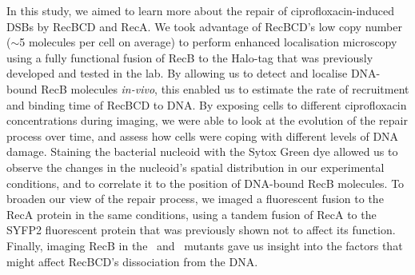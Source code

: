 In this study, we aimed to learn more about the repair of ciprofloxacin-induced DSBs by RecBCD and RecA. We took advantage of RecBCD's low copy number ($\sim$5 molecules per cell on average\cite{Lepore2019a}) to perform enhanced localisation microscopy\cite{Yu2006, Elf2007} using a fully functional fusion of RecB to the Halo-tag that was previously developed and tested in the lab\cite{Lepore2019a}. By allowing us to detect and localise DNA-bound RecB molecules \emph{in-vivo}, this enabled us to estimate the rate of recruitment and binding time of RecBCD to DNA. By exposing cells to different ciprofloxacin concentrations during imaging, we were able to look at the evolution of the repair process over time, and assess how cells were coping with different levels of DNA damage. Staining the bacterial nucleoid with the Sytox Green dye allowed us to observe the changes in the nucleoid's spatial distribution in our experimental conditions, and to correlate it to the position of DNA-bound RecB molecules. To broaden our view of the repair process, we imaged a fluorescent fusion to the RecA protein in the same conditions, using a tandem fusion of RecA to the SYFP2 fluorescent protein that was previously shown not to affect its function\cite{Wiktor2021}. Finally, imaging RecB in the \dreca\ and \teneighty\ mutants gave us insight into the factors that might affect RecBCD's dissociation from the DNA.
